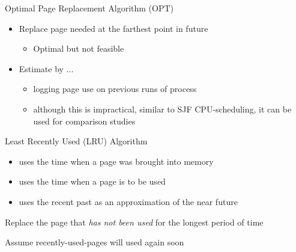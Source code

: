 \begin{frame}{Optimal Page Replacement Algorithm (OPT)}
  \begin{center}
  \end{center}
  \begin{itemize}
  \item Replace page needed at the farthest point in future
    \begin{itemize}
    \item Optimal but not feasible
    \end{itemize}
  \item Estimate by ...
    \begin{itemize}
    \item logging page use on previous runs of process
    \item although this is impractical, similar to SJF CPU-scheduling, it can be used for
      comparison studies
    \end{itemize}
  \end{itemize}
\end{frame}

\begin{frame}{Least Recently Used (LRU) Algorithm}
  \begin{itemize}
  \item[FIFO] uses the time when a page was brought into memory
  \item[OPT] uses the time when a page is to be used
  \item[LRU] uses the recent past as an approximation of the near future
  \end{itemize}
  Replace the page that \emph{has not been used} for the longest period of time
  \begin{block}{Assume recently-used-pages will used again soon}
    \begin{center}
    \end{center}
  \end{block}
\end{frame}

